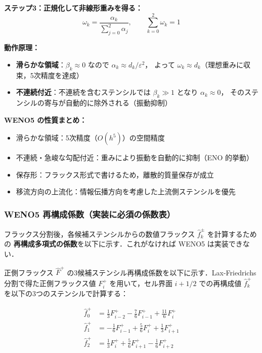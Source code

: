 \textbf{ステップ3：正規化して非線形重みを得る：}
\[
  \omega_k = \frac{\alpha_k}{\displaystyle\sum_{j=0}^{2}\alpha_j}, \qquad \sum_{k=0}^{2}\omega_k = 1
\]

\textbf{動作原理：}
\begin{itemize}
  \item \textbf{滑らかな領域}：$\beta_k \approx 0$ なので $\alpha_k \approx d_k/\varepsilon^2$，
        よって $\omega_k \approx d_k$（理想重みに収束，5次精度を達成）
  \item \textbf{不連続付近}：不連続を含むステンシルでは $\beta_k \gg 1$ となり $\alpha_k \approx 0$，
        そのステンシルの寄与が自動的に除外される（振動抑制）
\end{itemize}

\noindent\textbf{WENO5 の性質まとめ：}
\begin{itemize}
  \item 滑らかな領域：5次精度（$O(h^5)$）の空間精度
  \item 不連続・急峻な勾配付近：重みにより振動を自動的に抑制（ENO 的挙動）
  \item 保存形：フラックス形式で書けるため，離散的質量保存が成立
  \item 移流方向の上流化：情報伝播方向を考慮した上流側ステンシルを優先
\end{itemize}

\subsubsection{WENO5 再構成係数（実装に必須の係数表）}

フラックス分割後，各候補ステンシルからの数値フラックス $\hat{f}^\pm_k$ を計算するための
\textbf{再構成多項式の係数}を以下に示す．これがなければ WENO5 は実装できない．

正側フラックス $\hat{F}^+$ の3候補ステンシル再構成係数を以下に示す．Lax-Friedrichs 分割で得た正側フラックス値 $F^+_i$ を用いて，セル界面 $i+1/2$ での再構成値 $\hat{f}^+_k$ を以下の3つのステンシルで計算する：

\begin{align}
  \hat{f}^+_0 &= \frac{1}{3}F^+_{i-2} - \frac{7}{6}F^+_{i-1} + \frac{11}{6}F^+_i
  \label{eq:weno5_rec0} \\[4pt]
  \hat{f}^+_1 &= -\frac{1}{6}F^+_{i-1} + \frac{5}{6}F^+_i + \frac{1}{3}F^+_{i+1}
  \label{eq:weno5_rec1} \\[4pt]
  \hat{f}^+_2 &= \frac{1}{3}F^+_i + \frac{5}{6}F^+_{i+1} - \frac{1}{6}F^+_{i+2}
  \label{eq:weno5_rec2}
\end{align}

